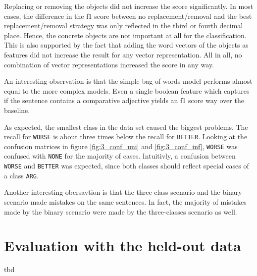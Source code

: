 Replacing or removing the objects did not increase the score significantly. In most cases, the difference in the f1 score between no replacement/removal and the best replacement/removal strategy was only reflected in the third or fourth decimal place. Hence, the concrete objects are not important at all for the classification. This is also supported by the fact that adding the word vectors of the objects as features did not increase the result for any vector representation. All in all, no combination of vector representations increased the score in any way.

An interesting observation is that the simple bag-of-words model performs almost equal to the more complex models. Even a single boolean feature which captures if the sentence contains a comparative adjective yields an f1 score way over the baseline.

As expected, the smallest class in the data set caused the biggest problems. The recall for \texttt{WORSE} is about three times below the recall for \texttt{BETTER}. Looking at the confusion matrices in figure \ref{fig:3_conf_uni} and \ref{fig:3_conf_inf}, \texttt{WORSE} was confused with \texttt{NONE} for the majority of cases. Intuitivly, a confusion between \texttt{WORSE} and \texttt{BETTER} was expected, since both classes should reflect special cases of a class \texttt{ARG}.

Another interesting obersavtion is that the three-class scenario and the binary scenario made mistakes on the same sentences. In fact, the majority of mistakes made by the binary scenario were made by the three-classes scenario as well.


\section{Evaluation with the held-out data}
tbd
\label{sec:final}

